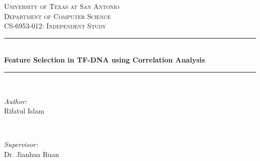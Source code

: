 \begin{titlepage}

\newcommand{\HRule}{\rule{\linewidth}{0.5mm}} %

\center %
 

\textsc{\LARGE University of Texas at San Antonio}\\[1.5cm] %
\textsc{\Large Department of Computer Science}\\[0.5cm] %
\textsc{\large CS-6953-012: Independent Study}\\[0.5cm] %


\HRule \\[0.4cm]
{ \huge \bfseries Feature Selection in TF-DNA using Correlation Analysis}\\[0.4cm] %
\HRule \\[1.5cm]
 

\begin{minipage}{0.4\textwidth}
\begin{flushleft} \large
\emph{Author:}\\
Rifatul Islam %
\end{flushleft}
\end{minipage}
~
\begin{minipage}{0.4\textwidth}
\begin{flushright} \large
\emph{Supervisor:} \\
Dr. Jianhua Ruan %
\end{flushright}
\end{minipage}\\[2cm]



\end{titlepage}
